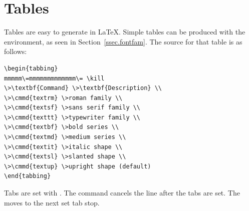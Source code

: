 \section{Tables}
Tables are easy to generate in \LaTeX .
Simple tables can be produced with the  environment, as seen
in Section~\ref{ssec.fontfam}.
The source for that table is as follows:
\begin{verbatim}
\begin{tabbing}
mmmmm\=mmmmmmmmmmmmm\= \kill
\>\textbf{Command} \>\textbf{Description} \\
\>\cmmd{textrm} \>roman family \\
\>\cmmd{textsf} \>sans serif family \\
\>\cmmd{texttt} \>typewriter family \\
\>\cmmd{textbf} \>bold series \\
\>\cmmd{textmd} \>medium series \\
\>\cmmd{textit} \>italic shape \\
\>\cmmd{textsl} \>slanted shape \\
\>\cmmd{textup} \>upright shape (default)
\end{tabbing}
\end{verbatim}
Tabs are set with \cmmd{=}.
The  command cancels the line after the tabs are set. 
The \cmmd{>} moves to the next set tab stop.

